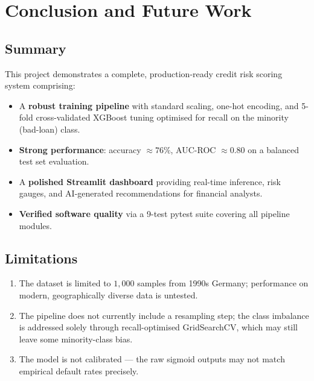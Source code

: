 \documentclass[12pt,a4paper]{article}
\theoremstyle{definition}
\begin{document}
\newpage

\section{Conclusion and Future Work}
\label{sec:conclusion}

\subsection{Summary}

This project demonstrates a complete, production-ready credit risk scoring
system comprising:

\begin{itemize}
  \item A \textbf{robust training pipeline} with standard scaling, one-hot
        encoding, and 5-fold cross-validated XGBoost tuning optimised for
        recall on the minority (bad-loan) class.
  \item \textbf{Strong performance}: accuracy $\approx 76\%$, AUC-ROC $\approx 0.80$
        on a balanced test set evaluation.
  \item A \textbf{polished Streamlit dashboard} providing real-time inference,
        risk gauges, and AI-generated recommendations for financial analysts.
  \item \textbf{Verified software quality} via a 9-test pytest suite covering all
        pipeline modules.
\end{itemize}

\subsection{Limitations}

\begin{enumerate}
  \item The dataset is limited to $1{,}000$ samples from 1990s Germany;
        performance on modern, geographically diverse data is untested.
  \item The pipeline does not currently include a resampling step; the class
        imbalance is addressed solely through recall-optimised GridSearchCV,
        which may still leave some minority-class bias.
  \item The model is not calibrated — the raw sigmoid outputs may not match
        empirical default rates precisely.
\end{enumerate}
\end{document}
